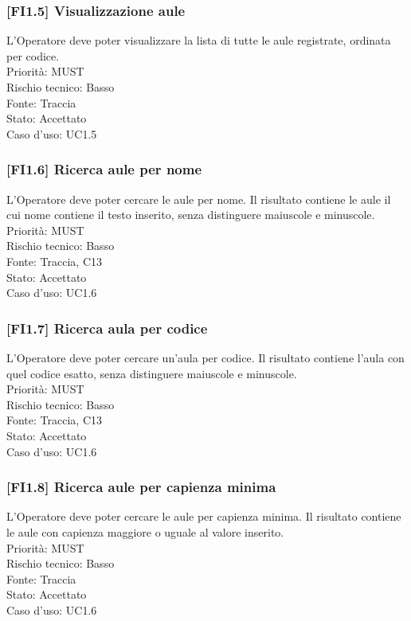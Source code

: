 \subsubsection{[FI1.5] Visualizzazione aule}
L'Operatore deve poter visualizzare la lista di tutte le aule registrate, ordinata per codice.\\
Priorità: MUST\\Rischio tecnico: Basso\\Fonte: Traccia\\Stato: Accettato\\Caso d'uso: UC1.5

\subsubsection{[FI1.6] Ricerca aule per nome}
L'Operatore deve poter cercare le aule per nome. Il risultato contiene le aule il cui nome contiene il testo inserito, senza distinguere maiuscole e minuscole.\\
Priorità: MUST\\Rischio tecnico: Basso\\Fonte: Traccia, C13\\Stato: Accettato\\Caso d'uso: UC1.6

\subsubsection{[FI1.7] Ricerca aula per codice}
L'Operatore deve poter cercare un'aula per codice. Il risultato contiene l'aula con quel codice esatto, senza distinguere maiuscole e minuscole.\\
Priorità: MUST\\Rischio tecnico: Basso\\Fonte: Traccia, C13\\Stato: Accettato\\Caso d'uso: UC1.6

\subsubsection{[FI1.8] Ricerca aule per capienza minima}
L'Operatore deve poter cercare le aule per capienza minima. Il risultato contiene le aule con capienza maggiore o uguale al valore inserito.\\
Priorità: MUST\\Rischio tecnico: Basso\\Fonte: Traccia\\Stato: Accettato\\Caso d'uso: UC1.6
